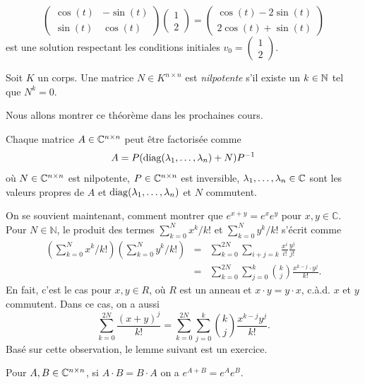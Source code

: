 \begin{example}
\begin{displaymath}
\begin{pmatrix}
    \cos(t)&-\sin(t)\\
    \sin(t)&\cos(t)
  \end{pmatrix} \begin{pmatrix}
    1\\
    2
\end{pmatrix}   =  \begin{pmatrix}
    \cos(t)-2\sin(t)\\
    2\cos(t)+\sin(t)
\end{pmatrix} 
\end{displaymath}
est une solution respectant les conditions initiales  $v_0 = 
\begin{pmatrix}
    1\\
    2
\end{pmatrix} $. 
\end{example}






\begin{definition}
  \label{def:29}Soit $K$ un corps. 
  Une matrice $N ∈ K^{n ×n}$ est \emph{nilpotente} s'il existe un $k \in \mathbb{N}$ tel que $N^k = 0$. 
\end{definition}

Nous allons montrer ce théorème dans les prochaines cours.  
\begin{theorem}
  \label{thr:32}
  Chaque matrice $A \in \mathbb{C}^{n \times n}$ peut être factorisée comme 
  \begin{displaymath}
    A = P ( \operatorname{diag}(\lambda_1,\dots,\lambda_n) + N) P^{-1}
  \end{displaymath}
où $N \in \mathbb{C}^{n \times n}$ est nilpotente, $P \in \mathbb{C}^{n \times n}$ est inversible,  $\lambda_1,\dots,\lambda_n \in \mathbb{C}$ sont les valeurs propres de $A$ et $\operatorname{diag}(\lambda_1,\dots,\lambda_n)$ et $N$ commutent. 
\end{theorem}
%
On se souvient maintenant, comment montrer que $e^{x+y}  = e^xe^y$ pour $x,y∈ ℂ$.  Pour $N ∈ ℕ$, le produit des termes
$∑_{k=0}^N x^k / k! $ et $∑_{k=0}^N y^k / k! $ s'écrit comme 
\begin{eqnarray}
  \left(∑_{k=0}^N x^k / k! \right) \left(∑_{k=0}^N y^k / k! \right) & = & \displaystyle  ∑_{k=0}^{2N}  ∑_{i+j = k} \frac{x^i}{  i!} \frac{y^j}{ j!} \\
  & = &  \displaystyle ∑_{k=0}^{2N}  ∑_{j = 0}^k \binom{k}{j} \frac{x^{k-j} ⋅ y^{j} }{k!}.   
\end{eqnarray}
En fait, c'est le cas pour $x,y ∈ R$, où $R$ est un anneau et $x ⋅ y  = y ⋅x$, c.à.d. $x$ et $y$ commutent.  Dans ce cas, on a aussi
\begin{displaymath}
  \displaystyle  ∑_{k=0}^{2N} \frac{(x+y)^j}{k!} =  \displaystyle  ∑_{k=0}^{2N}  ∑_{j = 0}^k \binom{k}{j} \frac{x^{k-j} y^{j} }{k!}.   
\end{displaymath}
%
Basé sur cette observation, le lemme suivant est un exercice. 
\begin{lemma}
  \label{lem:18}
  Pour $A,B \in \mathbb{C}^{n \times n}$, si $A\cdot B = B \cdot A$ on a $e^{A+B} = e^A e^B$. 
\end{lemma}



